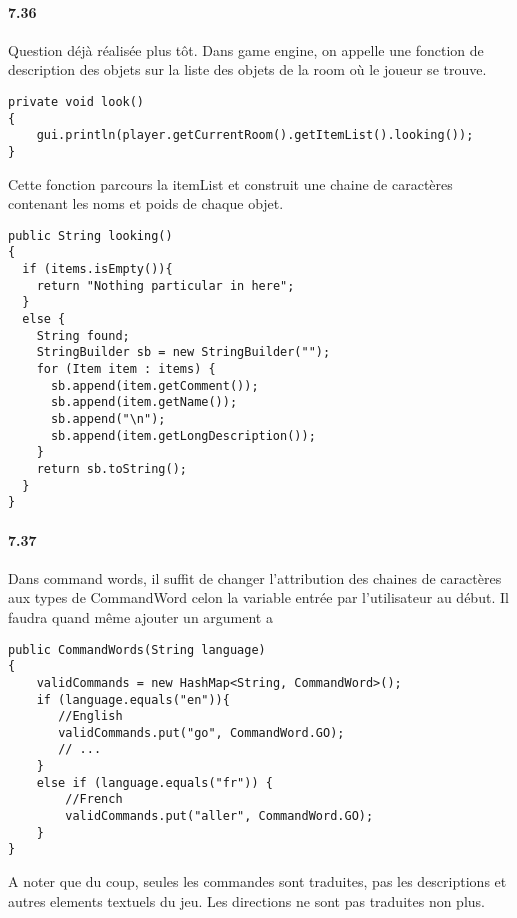 \documentclass[11pt,a4paper]{report}
\begin{document}
\paragraph{7.36}
Question déjà réalisée plus tôt. Dans game engine, on appelle une fonction de description des objets sur la liste des objets de la room où le joueur se trouve.
\begin{lstlisting}
private void look()
{
    gui.println(player.getCurrentRoom().getItemList().looking());
}
\end{lstlisting}
Cette fonction parcours la itemList et construit une chaine de caractères contenant les noms et poids de chaque objet.
\begin{lstlisting}
public String looking()
{
  if (items.isEmpty()){
    return "Nothing particular in here";
  }
  else {
    String found;
    StringBuilder sb = new StringBuilder("");
    for (Item item : items) {
      sb.append(item.getComment());
      sb.append(item.getName());
      sb.append("\n");
      sb.append(item.getLongDescription());
    }
    return sb.toString();
  }
}
\end{lstlisting}

\paragraph{7.37}
Dans command words, il suffit de changer l'attribution des chaines de caractères aux types de CommandWord celon la variable entrée par l'utilisateur au début. Il faudra quand même ajouter un argument a
\begin{lstlisting}
public CommandWords(String language)
{
    validCommands = new HashMap<String, CommandWord>();
    if (language.equals("en")){
       //English
       validCommands.put("go", CommandWord.GO);
	   // ...
    }
    else if (language.equals("fr")) {
        //French
        validCommands.put("aller", CommandWord.GO);
    }
}
\end{lstlisting}
A noter que du coup, seules les commandes sont traduites, pas les descriptions et autres elements textuels du jeu. Les directions ne sont pas traduites non plus.
\end{document}
